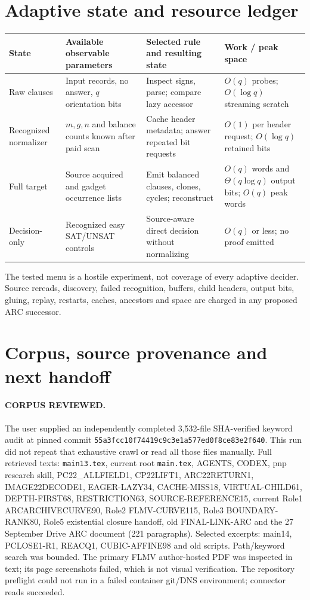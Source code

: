 \documentclass[11pt]{article}
\begin{document}
\section{Adaptive state and resource ledger}
\begin{center}\begin{tabular}{p{.17\linewidth}p{.23\linewidth}p{.26\linewidth}p{.23\linewidth}}\toprule
State & Available observable parameters & Selected rule and resulting state & Work / peak space\\\midrule
Raw clauses & Input records, no answer, $q$ orientation bits & Inspect signs, parse; compare lazy accessor & $O(q)$ probes; $O(\log q)$ streaming scratch\\
Recognized normalizer & $m,g,n$ and balance counts known after paid scan & Cache header metadata; answer repeated bit requests & $O(1)$ per header request; $O(\log q)$ retained bits\\
Full target & Source acquired and gadget occurrence lists & Emit balanced clauses, clones, cycles; reconstruct & $O(q)$ words and $\Theta(q\log q)$ output bits; $O(q)$ peak words\\
Decision-only & Recognized easy SAT/UNSAT controls & Source-aware direct decision without normalizing & $O(q)$ or less; no proof emitted\\\bottomrule
\end{tabular}\end{center}
The tested menu is a hostile experiment, not coverage of every adaptive decider. Source rereads, discovery, failed recognition, buffers, child headers, output bits, gluing, replay, restarts, caches, ancestors and space are charged in any proposed ARC successor.

\section{Corpus, source provenance and next handoff}
\paragraph{CORPUS REVIEWED.} The user supplied an independently completed 3,532-file SHA-verified keyword audit at pinned commit \texttt{55a3fcc10f74419c9c3e1a577ed0f8ce83e2f640}. This run did not repeat that exhaustive crawl or read all those files manually. Full retrieved texts: \texttt{main13.tex}, current root \texttt{main.tex}, AGENTS, CODEX, pnp research skill, PC22\_ALLFIELD1, CP22LIFT1, ARC22RETURN1, IMAGE22DECODE1, EAGER-LAZY34, CACHE-MISS18, VIRTUAL-CHILD61, DEPTH-FIRST68, RESTRICTION63, SOURCE-REFERENCE15, current Role1 ARCARCHIVECURVE90, Role2 FLMV-CURVE115, Role3 BOUNDARY-RANK80, Role5 existential closure handoff, old FINAL-LINK-ARC and the 27 September Drive ARC document (221 paragraphs). Selected excerpts: main14, PCLOSE1-R1, REACQ1, CUBIC-AFFINE98 and old scripts. Path/keyword search was bounded. The primary FLMV author-hosted PDF was inspected in text; its page screenshots failed, which is not visual verification. The repository preflight could not run in a failed container git/DNS environment; connector reads succeeded.
\end{document}
